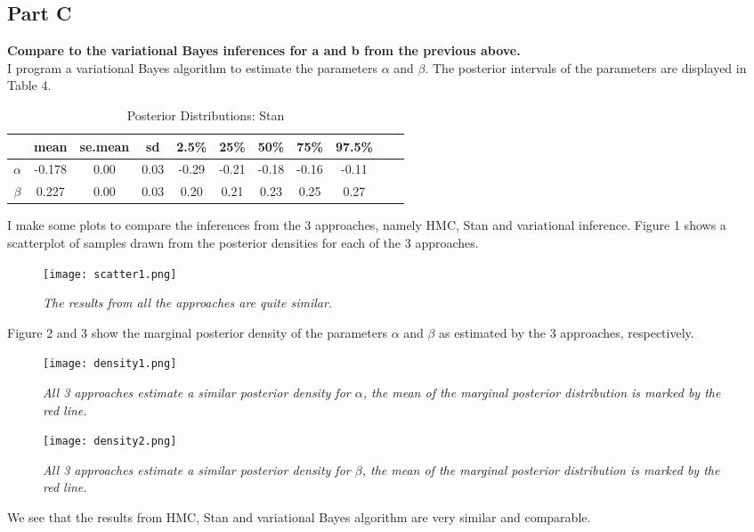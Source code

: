 \documentclass{article}
\begin{document}
\subsection{Part C}
\textbf{Compare to the variational Bayes inferences for a and b from the previous above.}\\
I program a variational Bayes algorithm to estimate the parameters $\alpha$ and $\beta$. The posterior intervals of the parameters are displayed in Table 4.
\begin{table} [htbp]
\caption {Posterior Distributions: Stan}
\vspace{2mm}
\def\arraystretch{1.5}
\centering \begin{tabular}{c c c c c c c c c c c} 
\hline\hline 
\vspace{1mm}
 & mean & se.mean  &  sd   & 2.5\%  &  25\% &   50\% &   75\% & 97.5\%  \\  [0.5ex] \hline
$\alpha$    &    -0.178  &  0.00& 0.03&    -0.29 &   -0.21 &   -0.18 &   -0.16 &   -0.11 \\
$\beta$    &     0.227 &   0.00& 0.03&   0.20  &   0.21  &   0.23  &   0.25  &   0.27   \\
\hline 
\end{tabular}
\end{table}
I make some plots to compare the inferences from the 3 approaches, namely HMC, Stan and variational inference. Figure 1 shows a scatterplot of samples drawn from the posterior densities for each of the 3 approaches.
 \begin{figure}[H]
\centering
\texttt{[image: scatter1.png]}
\caption{\textit{The results from all the approaches are quite similar.}}
\label{deltat}
\end{figure}
Figure 2 and 3 show the marginal posterior density of the parameters $\alpha$ and $\beta$ as estimated by the 3 approaches, respectively.
 \begin{figure}[H]
\centering
\texttt{[image: density1.png]}
\caption{\textit{All 3 approaches estimate a similar posterior density for $\alpha$, the mean of the marginal posterior distribution is marked by the red line.}}
\label{deltat}
\end{figure}
 \begin{figure}[H]
\centering
\texttt{[image: density2.png]}
\caption{\textit{All 3 approaches estimate a similar posterior density for $\beta$, the mean of the marginal posterior distribution is marked by the red line.}}
\label{deltat}
\end{figure}
We see that the results from HMC, Stan and variational Bayes algorithm are very similar and comparable.
\end{document}
